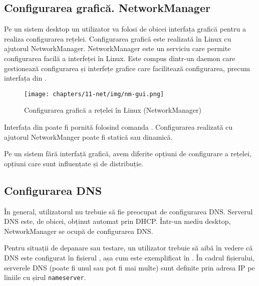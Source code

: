 \subsection{Configurarea grafică. NetworkManager}
\label{sec:net:linux-config:gui}

Pe un sistem desktop un utilizator va folosi de obicei interfața grafică pentru a realiza configurarea rețelei.
Configurarea grafică este realizată în Linux cu ajutorul NetworkManager.
NetworkManager este un serviciu care permite configurarea facilă a interfeței în Linux.
Este compus dintr-un daemon care gestionează configurarea și interfețe grafice care facilitează configurarea, precum interfața din .

\begin{figure}[!htbp]
  \centering
  \texttt{[image: chapters/11-net/img/nm-gui.png]}
  \caption{Configurarea grafică a rețelei în Linux (NetworkManager)}
  \label{fig:net:nm-gui}
\end{figure}

Interfața din  poate fi pornită folosind comanda .
Configurarea realizată cu ajutorul NetworkManger poate fi statică sau dinamică.

Pe un sistem fără interfață grafică, avem diferite opțiuni de configurare a rețelei, opțiuni care sunt influențate și de distribuție.

\subsection{Configurarea DNS}
\label{sec:net:linux-config:dns}

În general, utilizatorul nu trebuie să fie preocupat de configurarea DNS.
Serverul DNS este, de obicei, obținut automat prin DHCP.
Într-un mediu desktop, NetworkManager se ocupă de configurarea DNS.

Pentru situații de depanare sau testare, un utilizator trebuie să aibă în vedere că DNS este configurat în fișierul , așa cum este exemplificat în .
În cadrul fișierului, serverele DNS (poate fi unul sau pot fi mai multe) sunt definite prin adresa IP pe liniile cu șirul \texttt{nameserver}.

